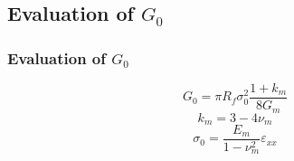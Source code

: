 \documentclass[first,firstsupp,lastsupp,handout,last,hyperref,table]{ETHclass}
\begin{document}
\subsection{Evaluation of $G_{0}$}
\begin{frame}
\frametitle{Evaluation of $G_{0}$}
\vspace{-0.7cm}
\footnotesize
\centering
\captionsetup[figure]{font=scriptsize,labelfont=scriptsize}
\begin{equation}
G_{0}=\pi R_{f}\sigma^{2}_{0}\frac{1+k_{m}}{8G_{m}}
\end{equation}
\begin{equation}
k_{m}=3-4\nu_{m}
\end{equation}
\begin{equation}
\sigma_{0}=\frac{E_{m}}{1-\nu^{2}_{m}}\varepsilon_{xx}
\end{equation}%
\end{frame}
\end{document}
